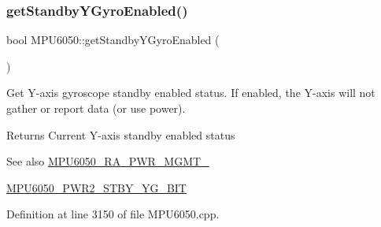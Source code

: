 \begin{DoxyCode}{0}

\end{DoxyCode}
\mbox{\label{classMPU6050_aaad2985f8d22aec123f1e1dabcdd427a}} 
\subsubsection{\texorpdfstring{getStandbyYGyroEnabled()}{getStandbyYGyroEnabled()}}
{\footnotesize\ttfamily bool M\+P\+U6050\+::get\+Standby\+Y\+Gyro\+Enabled (\begin{DoxyParamCaption}{ }\end{DoxyParamCaption})}

Get Y-\/axis gyroscope standby enabled status. If enabled, the Y-\/axis will not gather or report data (or use power). \begin{DoxyReturn}{Returns}
Current Y-\/axis standby enabled status 
\end{DoxyReturn}
\begin{DoxySeeAlso}{See also}
\mbox{\hyperlink{MPU6050_8h_aace6ce286da4d5f8c8f5ba6f80688e13}{M\+P\+U6050\+\_\+\+R\+A\+\_\+\+P\+W\+R\+\_\+\+M\+G\+M\+T\+\_}} 

\mbox{\hyperlink{MPU6050_8h_a81afc3f43cd9caf0739a3d3432718506}{M\+P\+U6050\+\_\+\+P\+W\+R2\+\_\+\+S\+T\+B\+Y\+\_\+\+Y\+G\+\_\+\+B\+IT}} 
\end{DoxySeeAlso}


Definition at line 3150 of file M\+P\+U6050.\+cpp.


